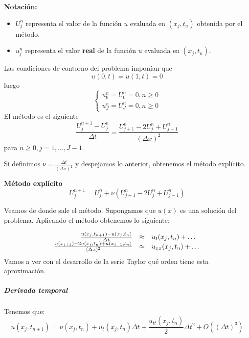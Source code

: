 \begin{mdframed}
	\textbf{Notación:}
	\begin{itemize}
		\vspace{-3mm}
	\item $U_j^n$ representa el valor de la función $u$ evaluada en $(x_j,t_n)$ obtenida por el método.
	\item $u_j^n$ representa el valor \textbf{real} de la función $u$ evaluada en $(x_j,t_n)$.
	\end{itemize}
\end{mdframed}

Las condiciones de contorno del problema imponían que 
$$u(0,t) = u(1,t) = 0$$
luego
\begin{equation*}
	\left\{
	\begin{array}{l}
	u_0^n = U_0^n = 0, n\ge 0\\
	u_J^n = U_J^n = 0, n\ge 0
	\end{array}
	\right.
\end{equation*}
El método es el siguiente
\begin{equation*}
	\frac{U_j^{n+1}-U_j^n}{\Delta t} =  \frac{U_{j+1}^n-2U_j^n+U_{j-1}^n}{(\Delta x)^2}
\end{equation*}
para $n\ge  0, j=1,\hdots ,J-1$.

\noindent Si definimos
$\nu = \frac{\Delta t}{(\Delta x )^2}$ y despejamos lo anterior, obtenemos el método explícito.
\begin{mdframed}
	\textbf{Método explícito}
	$$U_j^{n+1} = U_j^n+\nu\left(U_{j+1}^n - 2 U_j^n + U_{j-1}^n\right)$$
\end{mdframed}
Veamos de donde sale el método. Supongamos que $u(x)$ es una solución del problema. Aplicando el método obtenemos lo siguiente: 

\begin{equation*}
	\begin{array}{r l l}
	\frac{u(x_j, t_{n+1})-u(x_j,t_n)}{\Delta t} &\approx& u_t(x_j, t_n) + \hdots\\
	\frac{u(x_{j+1}) - 2u(x_j, t_n) + u(x_{j-1}, t_n)}{(\Delta x)^2} &\approx& u_{xx}(x_j, t_n) + \hdots
	\end{array}
\end{equation*}
Vamos a ver con el desarrollo de la serie Taylor qué orden tiene esta aproximación.

\subparagraph*{Derivada temporal} 
\mbox{}

Tenemos que:
$$u(x_j, t_{n+1}) = u(x_j, t_n) + u_t(x_j, t_n)\Delta t +\frac{u_{tt} (x_j,t_n)}{2}\Delta t ^2 + O\left((\Delta t)^3\right)$$

